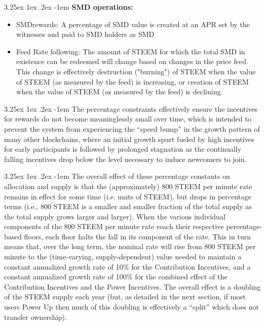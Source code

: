 \documentclass{article}
\makeatletter
\renewcommand\paragraph{\@startsection{paragraph}{5}{\z@}%
  {3.25ex \@plus1ex \@minus.2ex}%
  {-1em}%
  {\normalfont\normalsize\bfseries}}
\makeatother
\begin{document}
		\paragraph{}
			\textbf{SMD operations:}

		\begin{itemize}
			\item SMDrewards: A percentage of SMD value is created at an APR set by the witnesses and paid to SMD holders as SMD
			\item Feed Rate following: The amount of STEEM for which the total SMD in existence can be redeemed will change based on changes in the price feed. This change is effectively destruction ("burning") of STEEM when the value of STEEM (as measured by the feed) is increasing, or creation of STEEM when the value of STEEM (as measured by the feed) is declining.
		\end{itemize}

		\paragraph{}
			The percentage constraints effectively ensure the incentives for rewards do not become meaninglessly small over time, which is intended to prevent the system from experiencing the “speed bump” in the growth pattern of many other blockchains, where an initial growth spurt fueled by high incentives for early participants is followed by prolonged stagnation as the continually falling incentives drop below the level necessary to induce newcomers to join.

		\paragraph{}
			The overall effect of these percentage constants on allocation and supply is that the (approximately) 800 STEEM per minute rate remains in effect for some time (i.e. units of STEEM), but drops in percentage terms (i.e., 800 STEEM is a smaller and smaller fraction of the total supply as the total supply grows larger and larger). When the various individual components of the 800 STEEM per minute rate reach their respective percentage-based floors, each floor halts the fall in its component of the rate. This in turn means that, over the long term, the nominal rate will rise from 800 STEEM per minute to the (time-varying, supply-dependent) value needed to maintain a constant annualized growth rate of 10\% for the Contribution Incentives, and a constant annualized growth rate of 100\% for the combined effect of the Contribution Incentives and the Power Incentives. The overall effect is a doubling of the STEEM supply each year (but, as detailed in the next section, if most users Power Up then much of this doubling is effectively a “split” which does not transfer ownership).
\end{document}
